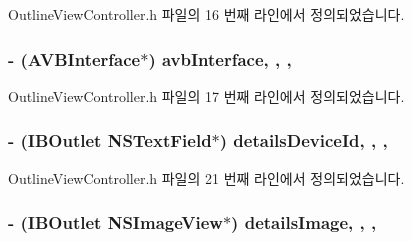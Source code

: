 Outline\+View\+Controller.\+h 파일의 16 번째 라인에서 정의되었습니다.

\subsubsection[{\texorpdfstring{avb\+Interface}{avbInterface}}]{\setlength{\rightskip}{0pt plus 5cm}-\/ (A\+V\+B\+Interface$\ast$) avb\+Interface\hspace{0.3cm}{\ttfamily [read]}, {\ttfamily [write]}, {\ttfamily [atomic]}, {\ttfamily [copy]}}\hypertarget{interface_outline_view_controller_aa2eb2773d9828983a52f0c3d23170b8a}{}\label{interface_outline_view_controller_aa2eb2773d9828983a52f0c3d23170b8a}


Outline\+View\+Controller.\+h 파일의 17 번째 라인에서 정의되었습니다.

\subsubsection[{\texorpdfstring{details\+Device\+Id}{detailsDeviceId}}]{\setlength{\rightskip}{0pt plus 5cm}-\/ (I\+B\+Outlet N\+S\+Text\+Field$\ast$) details\+Device\+Id\hspace{0.3cm}{\ttfamily [read]}, {\ttfamily [write]}, {\ttfamily [atomic]}, {\ttfamily [weak]}}\hypertarget{interface_outline_view_controller_ac80161778b5979fffdc02a7de71bf762}{}\label{interface_outline_view_controller_ac80161778b5979fffdc02a7de71bf762}


Outline\+View\+Controller.\+h 파일의 21 번째 라인에서 정의되었습니다.

\subsubsection[{\texorpdfstring{details\+Image}{detailsImage}}]{\setlength{\rightskip}{0pt plus 5cm}-\/ (I\+B\+Outlet N\+S\+Image\+View$\ast$) details\+Image\hspace{0.3cm}{\ttfamily [read]}, {\ttfamily [write]}, {\ttfamily [atomic]}, {\ttfamily [weak]}}\hypertarget{interface_outline_view_controller_a39e8e2bf1c9771ad4df7ca12b2fc44bd}{}\label{interface_outline_view_controller_a39e8e2bf1c9771ad4df7ca12b2fc44bd}


